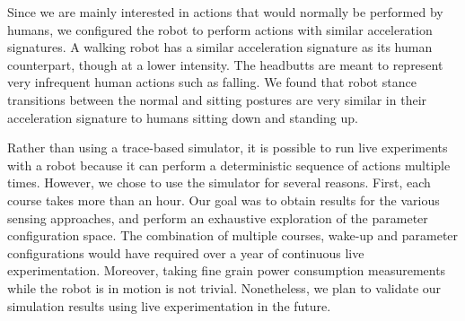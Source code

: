 Since we are mainly interested in actions that would normally be
performed by humans, we configured the robot to perform actions with
similar acceleration signatures. A walking robot has a similar
acceleration signature as its human counterpart, though at a lower
intensity. The headbutts are meant to represent very infrequent human
actions such as falling. We found that robot stance transitions
between the normal and sitting postures are very similar in their
acceleration signature to humans sitting down and standing up.

Rather than using a trace-based simulator, it is possible to run live
experiments with a robot because it can perform a deterministic
sequence of actions multiple times. However, we chose to use the
simulator for several reasons. First, each course takes more than an
hour. Our goal was to obtain results for the various sensing
approaches, and perform an exhaustive exploration of the parameter
configuration space. The combination of multiple courses, wake-up and
parameter configurations would have required over a year of continuous
live experimentation. Moreover, taking fine grain power consumption
measurements while the robot is in motion is not trivial.
Nonetheless, we plan to validate our simulation results using live
experimentation in the future.

